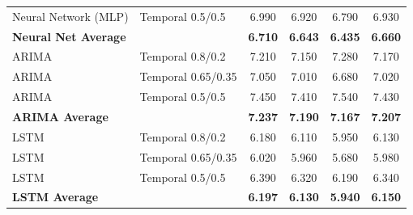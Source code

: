 \documentclass[11pt,a4paper]{article}
\begin{document}
\begin{table}[H]
\begin{tabular}{llcccc}
Neural Network (MLP) & Temporal 0.5/0.5 & 6.990 & 6.920 & 6.790 & 6.930 \\
\textbf{Neural Net Average} & & \textbf{6.710} & \textbf{6.643} & \textbf{6.435} & \textbf{6.660} \\
\midrule
ARIMA & Temporal 0.8/0.2 & 7.210 & 7.150 & 7.280 & 7.170 \\
ARIMA & Temporal 0.65/0.35 & 7.050 & 7.010 & 6.680 & 7.020 \\
ARIMA & Temporal 0.5/0.5 & 7.450 & 7.410 & 7.540 & 7.430 \\
\textbf{ARIMA Average} & & \textbf{7.237} & \textbf{7.190} & \textbf{7.167} & \textbf{7.207} \\
\midrule
LSTM & Temporal 0.8/0.2 & 6.180 & 6.110 & 5.950 & 6.130 \\
LSTM & Temporal 0.65/0.35 & 6.020 & 5.960 & 5.680 & 5.980 \\
LSTM & Temporal 0.5/0.5 & 6.390 & 6.320 & 6.190 & 6.340 \\
\textbf{LSTM Average} & & \textbf{6.197} & \textbf{6.130} & \textbf{5.940} & \textbf{6.150} \\
\bottomrule
\end{tabular}
\end{table}
\end{document}

